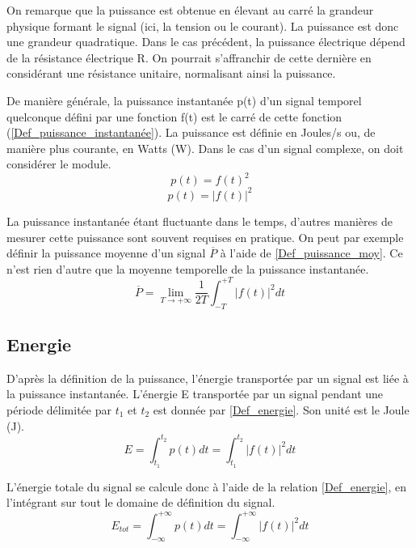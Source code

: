 	On remarque que la puissance est obtenue en élevant au carré la grandeur physique formant le signal (ici, la tension ou le courant). La puissance est donc une grandeur quadratique. Dans le cas précédent, la puissance électrique dépend de la résistance électrique R. On pourrait s'affranchir de cette dernière en considérant une résistance unitaire, normalisant ainsi la puissance.
	
	De manière générale, la puissance instantanée p(t) d'un signal temporel quelconque défini par une fonction f(t) est le carré de cette fonction (\ref{Def_puissance_instantanée}). La puissance est définie en Joules/s ou, de manière plus courante, en Watts (W). Dans le cas d'un signal complexe, on doit considérer le module.
	\begin{equation}\label{Def_puissance_instantanée}
	p(t)=f(t)^{2}
	\end{equation}
	\begin{equation}\label{Def_puissance_instantanée_complexe}
	p(t)=|f(t)|^{2}
	\end{equation}
	
	La puissance instantanée étant fluctuante dans le temps, d'autres manières de mesurer cette puissance sont souvent requises en pratique. On peut par exemple définir la puissance moyenne d'un signal $\overline{P}$ à l'aide de \ref{Def_puissance_moy}. Ce n'est rien d'autre que la moyenne temporelle de la puissance instantanée.
	\begin{equation}\label{Def_puissance_moy}
	\overline{P}=\lim_{T \to +\infty}\frac{1}{2T}\int_{-T}^{+T}|f(t)|^{2}dt
	\end{equation}
	

	\subsection{Energie}
	D'après la définition de la puissance, l'énergie transportée par un signal est liée à la puissance instantanée. L'énergie E transportée par un signal pendant une période délimitée par $t_{1}$ et $t_{2}$ est donnée par \ref{Def_energie}. Son unité est le Joule (J).
	\begin{equation}\label{Def_energie}
	E=\int_{t_{1}}^{t_{2}}p(t)dt=\int_{t_{1}}^{t_{2}}|f(t)|^{2}dt
	\end{equation} 
	
	L'énergie totale du signal se calcule donc à l'aide de la relation \ref{Def_energie}, en l'intégrant sur tout le domaine de définition du signal.
	\begin{equation}\label{Def_energie_tot}
	E_{tot}=\int_{-\infty}^{+\infty}p(t)dt=\int_{-\infty}^{+\infty}|f(t)|^{2}dt
	\end{equation}
	
